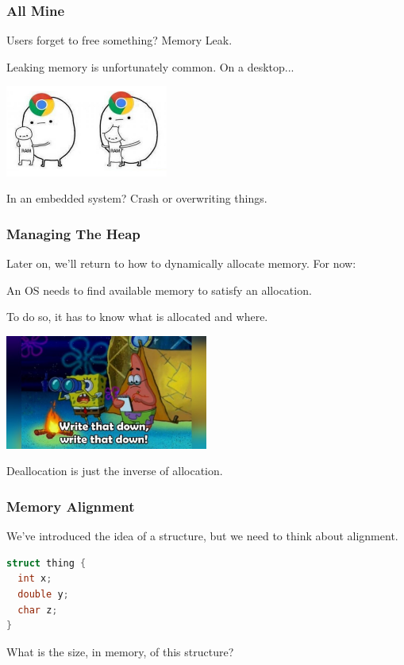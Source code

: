 \begin{frame}
\frametitle{All Mine}

Users forget to free something? \alert{Memory Leak}.

Leaking memory is unfortunately common. On a desktop...
\begin{center}
  \includegraphics[width=0.4\textwidth]{images/chrome.jpg}
\end{center}

In an embedded system? Crash or overwriting things.

\end{frame}

\begin{frame}
\frametitle{Managing The Heap}

Later on, we'll return to how to dynamically allocate memory. For now:

An OS needs to find available memory to satisfy an allocation.

To do so, it has to know what is allocated and where.

\begin{center}
  \includegraphics[width=0.5\textwidth]{images/writedown.jpg}
\end{center}

Deallocation is just the inverse of allocation.

\end{frame}

\begin{frame}[fragile]
\frametitle{Memory Alignment}

We've introduced the idea of a structure, but we need to think about alignment.

\begin{lstlisting}[language=C]
struct thing {
  int x;
  double y;
  char z;
}
\end{lstlisting}

What is the size, in memory, of this structure?

\end{frame}

